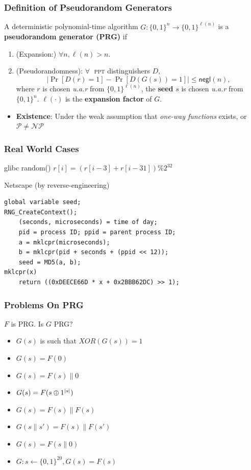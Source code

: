 \begin{frame}\frametitle{Definition of Pseudorandom Generators}
\begin{definition}\label{def:pg}
A deterministic polynomial-time algorithm $G : \{0,1\}^n \to \{0,1\}^{\ell(n)}$ is a \textbf{pseudorandom generator (PRG)} if
\begin{enumerate}
\item (Expansion:) $\forall n, \ell(n) > n$.
\item (Pseudorandomness): $\forall\;$ \textsc{ppt} distinguishers $D$,
\[ \left|\Pr[D(r)=1] - \Pr[D(G(s))=1]\right| \le \mathsf{negl}(n),
\]
where $r$ is chosen \emph{u.a.r} from $\{0,1\}^{\ell(n)}$, the \textbf{seed} $s$ is chosen \emph{u.a.r} from $\{0,1\}^n$. $\ell(\cdot)$ is the \textbf{expansion factor} of $G$.
\end{enumerate}
\end{definition}
\begin{itemize}
\item \textbf{Existence}: Under the weak assumption that \emph{one-way functions} exists, or $\mathcal{P} \ne \mathcal{NP}$
\end{itemize}
\end{frame}
\begin{frame}[fragile]\frametitle{Real World Cases}
\begin{exampleblock}{glibc random()}
$r[i] = (r[i-3] + r[i-31])\%2^{32}$
\end{exampleblock}
\begin{exampleblock}{Netscape (by reverse-engineering)}
\begin{verbatim}
global variable seed; 
RNG_CreateContext();
    (seconds, microseconds) = time of day;
    pid = process ID; ppid = parent process ID;
    a = mklcpr(microseconds);
    b = mklcpr(pid + seconds + (ppid << 12));
    seed = MD5(a, b);
mklcpr(x)
    return ((0xDEECE66D * x + 0x2BBB62DC) >> 1);
\end{verbatim}
\end{exampleblock}
\end{frame}
\begin{frame}\frametitle{Problems On PRG}
\begin{exampleblock}{$F$ is PRG. Is $G$ PRG?}
\begin{itemize}
\item $G(s)$ is such that $XOR(G(s)) = 1$
\item $G(s)=F(0)$
\item $G(s)=F(s)\| 0$
\item $G(s)=F(s\oplus 1^{\lvert s\rvert})$
\item $G(s)=F(s)\| F(s)$
\item $G(s\| s')=F(s)\| F(s')$
\item $G(s)=F(s\|0)$
\item $G: s \gets \{0,1\}^{20}, G(s) = F(s)$
\end{itemize}
\end{exampleblock}
\end{frame}
